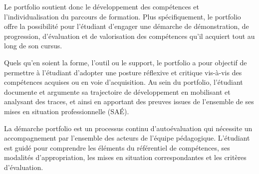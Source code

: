 \documentclass[10pt]{article}
\begin{document}
Le portfolio soutient donc le développement des compétences et
l’individualisation du parcours de formation.  Plus spécifiquement, le
portfolio offre la possibilité pour l’étudiant d’engager une démarche de
démonstration, de progression, d’évaluation et de valorisation des
compétences qu’il acquiert tout au long de son cursus.

Quels qu’en soient la forme, l’outil ou le support, le portfolio a pour
objectif de permettre à l’étudiant d’adopter une posture réflexive et
critique vis-à-vis des compétences acquises ou en voie d’acquisition. Au
sein du portfolio, l’étudiant documente et argumente sa trajectoire de
développement en mobilisant et analysant des traces, et ainsi en
apportant des preuves issues de l’ensemble de ses mises en situation
professionnelle (SAÉ).

La démarche portfolio est un processus continu d’autoévaluation qui
nécessite un accompagnement par l’ensemble des acteurs de l’équipe
pédagogique. L’étudiant est guidé pour comprendre les éléments du
référentiel de compétences, ses modalités d’appropriation, les mises en
situation correspondantes et les critères d’évaluation.
\end{document}
